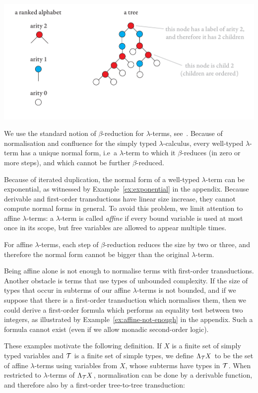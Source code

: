 \begin{center}
\includegraphics[scale=.3, page=45]{pics.pdf}
\end{center}
We use the standard notion of $\beta$-reduction for $\lambda$-terms, see~\cite[Definition 1.2.1]{sorensen_lectures_2006}. 
Because of normalisation and confluence for the simply typed $\lambda$-calculus, every well-typed $\lambda$-term has a unique normal form, i.e~a $\lambda$-term to which it $\beta$-reduces (in zero or more steps), and which cannot be further $\beta$-reduced.


Because of iterated duplication, the normal form of a well-typed $\lambda$-term can be exponential, as witnessed by Example~\ref{ex:exponential} in the appendix.
Because derivable and first-order transductions have linear size increase, they cannot compute normal forms in general. To  avoid this problem, we  limit attention to affine $\lambda$-terms: a $\lambda$-term is called \emph{affine} if every bound variable is used at most once in its scope, but free variables are allowed to appear multiple times.

For affine $\lambda$-terms, each step of $\beta$-reduction reduces the size by two or three, and therefore the normal form cannot be bigger than the original $\lambda$-term. 

Being affine alone is not enough to normalise terms with first-order transductions. Another obstacle is terms that use types of unbounded complexity. If the size of types that occur in subterms of our affine $\lambda$-terms is not bounded, and if we suppose that there is a first-order transduction which normalises them, then we could derive a first-order formula which performs an equality test between two integers, as illustrated by Example~\ref{ex:affine-not-enough} in the appendix. Such a formula cannot exist (even if we allow monadic second-order logic).


These examples motivate the following definition. If $X$ is a finite set of simply typed variables and ${\mathcal T}$ is a finite set of simple types, we define $\Lambda_{\mathcal T} X $ to be the set of affine $\lambda$-terms using variables from $X$, whose subterms have 	 types in $\mathcal T$.  When restricted to $\lambda$-terms of $\Lambda_{\mathcal T} X $, normalisation can be done by a derivable function, and therefore also by a first-order tree-to-tree transduction: 

